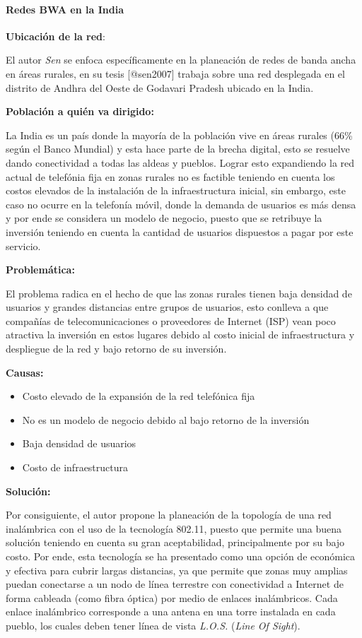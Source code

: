 \documentclass[]{article}
\providecommand{\tightlist}{%
  \setlength{\itemsep}{0pt}\setlength{\parskip}{0pt}}
\let\oldparagraph\paragraph
\renewcommand{\paragraph}[1]{\oldparagraph{#1}\mbox{}}
\begin{document}
\paragraph{Redes BWA en la India}\label{redes-bwa-en-la-india}

\textbf{Ubicación de la red}:

El autor \emph{Sen} se enfoca específicamente en la planeación de redes
de banda ancha en áreas rurales, en su tesis {[}@sen2007{]} trabaja
sobre una red desplegada en el distrito de Andhra del Oeste de Godavari
Pradesh ubicado en la India.

\textbf{Población a quién va dirigido:}

La India es un país donde la mayoría de la población vive en áreas
rurales (66\% según el Banco Mundial) y esta hace parte de la brecha
digital, esto se resuelve dando conectividad a todas las aldeas y
pueblos. Lograr esto expandiendo la red actual de telefónia fija en
zonas rurales no es factible teniendo en cuenta los costos elevados de
la instalación de la infraestructura inicial, sin embargo, este caso no
ocurre en la telefonía móvil, donde la demanda de usuarios es más densa
y por ende se considera un modelo de negocio, puesto que se retribuye la
inversión teniendo en cuenta la cantidad de usuarios dispuestos a pagar
por este servicio.

\textbf{Problemática:}

El problema radica en el hecho de que las zonas rurales tienen baja
densidad de usuarios y grandes distancias entre grupos de usuarios, esto
conlleva a que compañías de telecomunicaciones o proveedores de Internet
(ISP) vean poco atractiva la inversión en estos lugares debido al costo
inicial de infraestructura y despliegue de la red y bajo retorno de su
inversión.

\textbf{Causas:}

\begin{itemize}
\tightlist
\item
  Costo elevado de la expansión de la red telefónica fija
\item
  No es un modelo de negocio debido al bajo retorno de la inversión
\item
  Baja densidad de usuarios
\item
  Costo de infraestructura
\end{itemize}

\textbf{Solución:}

Por consiguiente, el autor propone la planeación de la topología de una
red inalámbrica con el uso de la tecnología 802.11, puesto que permite
una buena solución teniendo en cuenta su gran aceptabilidad,
principalmente por su bajo costo. Por ende, esta tecnología se ha
presentado como una opción de económica y efectiva para cubrir largas
distancias, ya que permite que zonas muy amplias puedan conectarse a un
nodo de línea terrestre con conectividad a Internet de forma cableada
(como fibra óptica) por medio de enlaces inalámbricos. Cada enlace
inalámbrico corresponde a una antena en una torre instalada en cada
pueblo, los cuales deben tener línea de vista \emph{L.O.S.} (\emph{Line
Of Sight}).
\end{document}
